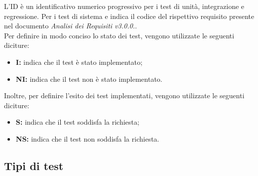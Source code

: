 L'ID è un identificativo numerico progressivo per i test di unità, integrazione e regressione. Per i test di sistema e
indica il codice del rispettivo requisito presente nel documento \textit{Analisi dei Requisiti v3.0.0.}.\\
Per definire in modo conciso lo stato dei test, vengono utilizzate le seguenti diciture:
\begin{itemize}
    \item \textbf{I:} indica che il test è stato implementato;
    \item \textbf{NI:} indica che il test non è stato implementato.
\end{itemize}
Inoltre, per definire l'esito dei test implementati, vengono utilizzate le seguenti diciture:
\begin{itemize}
    \item \textbf{S:} indica che il test soddisfa la richiesta;
    \item \textbf{NS:} indica che il test non soddisfa la richiesta.
\end{itemize}
\subsection{Tipi di test}
